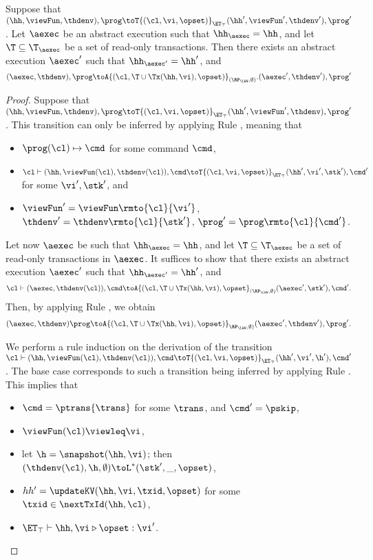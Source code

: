 \begin{proposition}
\label{prop:kv2aexec_transition}
Suppose that $(\hh, \viewFun, \thdenv), \prog \toT{(\cl, \vi, \opset)}_{\ET_{\top}} (\hh', 
\viewFun', \thdenv'), \prog'$. Let $\aexec$ be an abstract execution 
such that $\hh_{\aexec} = \hh$, and let $\T \subseteq \T_{\aexec}$ be a 
set of read-only transactions. Then there exists an abstract execution $\aexec'$ 
such that $\hh_{\aexec'} = \hh'$, and 
\[
(\aexec, \thdenv), \prog \toA{(\cl, \T \cup \Tx(\hh, \vi), \opset)}_{(\RP_{\LWW}, \emptyset)}. 
(\aexec', \thdenv'), \prog'
\]
\end{proposition}
\begin{proof}
Suppose that $(\hh, \viewFun, \thdenv), \prog \toT{(\cl, \vi, \opset)}_{\ET_{\top}} (\hh', \viewFun', \thdenv), \prog'$. 
This transition can only be inferred by applying Rule , meaning that 
\begin{itemize}
\item $\prog(\cl) \mapsto \cmd$ for some command $\cmd$, 
\item $\cl \vdash (\hh, \viewFun(\cl), \thdenv(\cl)), \cmd \toT{(\cl, \vi, \opset)}_{\ET_{\top}} (\hh', \vi', \stk'), \cmd'$ 
for some $\vi', \stk'$, and 
\item $\viewFun' = \viewFun\rmto{\cl}{\vi'}$, $\thdenv' = \thdenv\rmto{\cl}{\stk'}$, $\prog' = \prog\rmto{\cl}{\cmd'}$. 
\end{itemize}
Let now $\aexec$ be such that $\hh_{\aexec} = \hh$, and let $\T \subseteq \T_{\aexec}$ be a set of read-only 
transactions in $\aexec$. It suffices to show that there exists an abstract execution $\aexec'$ such that 
$\hh_{\aexec'} = \hh'$, and 
\[
\cl \vdash (\aexec, \thdenv(\cl)), \cmd \toA{(\cl, \T \cup \Tx(\hh, \vi), \opset}_{(\RP_{\LWW}, \emptyset)} (\aexec', \stk'), \cmd'.
\]
Then, by applying Rule , we obtain 
\[ 
(\aexec, \thdenv) \prog \toA{(\cl, \T \cup \Tx(\hh,\vi), \opset)}_{\RP_{\LWW}, \emptyset)} (\aexec' ,\thdenv'), \prog'.
\]

We perform a rule induction on the derivation of the transition $\cl \vdash (\hh, \viewFun(\cl), \thdenv(\cl)), \cmd \toT{(\cl, \vi, \opset)}_{\ET_{\top}} (\hh', \vi', \h'), \cmd'$. 
The base case corresponds to such a transition being inferred by applying Rule . 
This implies that 
\begin{itemize}
\item $\cmd = \ptrans{\trans}$ for some $\trans$, and $\cmd' = \pskip$,
\item $\viewFun(\cl) \viewleq \vi$, 
\item let $\h = \snapshot(\hh, \vi)$; then $(\thdenv(\cl), \h, \emptyset) \toL^{\ast} (\stk', \_, \opset)$, 
\item $hh' = \updateKV(\hh, \vi, \txid, \opset)$ for some $\txid \in \nextTxId(\hh, \cl)$, 
\item $\ET_{\top} \vdash \hh, \vi \triangleright \opset: \vi'$.
\end{itemize}


\end{proof}
